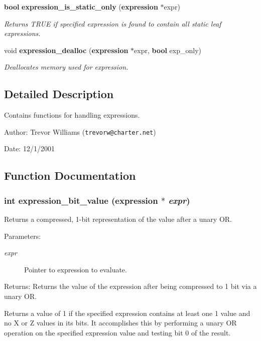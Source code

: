 \begin{CompactItemize}
{\bf bool} {\bf expression\_\-is\_\-static\_\-only} ({\bf expression} $\ast$expr)
\begin{CompactList}\small\item\em Returns TRUE if specified expression is found to contain all static leaf expressions.\item\end{CompactList}\item 
void {\bf expression\_\-dealloc} ({\bf expression} $\ast$expr, {\bf bool} exp\_\-only)
\begin{CompactList}\small\item\em Deallocates memory used for expression.\item\end{CompactList}\end{CompactItemize}


\subsection{Detailed Description}
Contains functions for handling expressions.

\begin{Desc}
\item[Author:]Trevor Williams ({\tt trevorw@charter.net}) \end{Desc}
\begin{Desc}
\item[Date:]12/1/2001 \end{Desc}


\subsection{Function Documentation}
\subsubsection{\setlength{\rightskip}{0pt plus 5cm}int expression\_\-bit\_\-value ({\bf expression} $\ast$ {\em expr})}\label{expr_8h_a11}


Returns a compressed, 1-bit representation of the value after a unary OR.

\begin{Desc}
\item[Parameters:]
\begin{description}
\item[{\em expr}]Pointer to expression to evaluate.\end{description}
\end{Desc}
\begin{Desc}
\item[Returns:]Returns the value of the expression after being compressed to 1 bit via a unary OR.\end{Desc}
Returns a value of 1 if the specified expression contains at least one 1 value and no X or Z values in its bits. It accomplishes this by performing a unary OR operation on the specified expression value and testing bit 0 of the result. 
